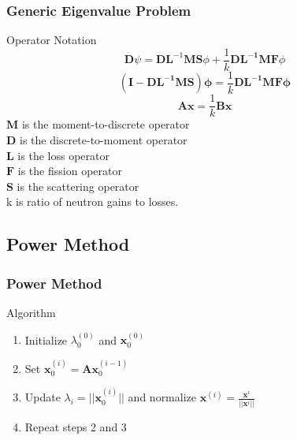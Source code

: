\documentclass[fleqn]{beamer}
\begin{document}
\begin{frame}
\frametitle{Generic Eigenvalue Problem\footnotemark}
\begin{block}{Operator Notation}
\vspace*{-\baselineskip}\setlength\belowdisplayshortskip{0pt}
\begin{equation*}
  \mathbf{D} \psi =  \mathbf{DL}^{-1}\mathbf{MS}\phi + \frac{1}{k} \mathbf{DL^{-1}MF} \phi  
 \label{eq:operatortrans}
\end{equation*}
\begin{equation*}
  \mathbf{(I - DL^{-1}MS)} \mathbf{\phi} = \frac{1}{k} \mathbf{DL^{-1}MF} \mathbf{\phi}  
 \label{eq:keig}
\end{equation*}
\begin{equation*}
 \mathbf{Ax} = \frac{1}{k} \mathbf{Bx}  
 \label{eq:Axb}
\end{equation*}
$\mathbf{M}$ is the moment-to-discrete operator\\
$\mathbf{D}$ is the discrete-to-moment operator\\
$\mathbf{L}$ is the loss operator\\
$\mathbf{F}$ is the fission operator\\
$\mathbf{S}$ is the scattering operator\\
k is ratio of neutron gains to losses.
\end{block}
\end{frame}    

\subsection{Power Method}
\begin{frame}
\frametitle{Power Method}
\begin{block}{Algorithm}
\begin{enumerate}
  \item Initialize $\lambda^{(0)}_0$ and $\mathbf{x}^{(0)}_0$ 
  \item Set $\mathbf{x}^{(i)}_0=\mathbf{A}\mathbf{x}^{(i-1)}_0$
  \item Update $\lambda_{i} = ||\mathbf{x}^{(i)}_0||$ and normalize $\mathbf{x}^{(i)} =\frac{\mathbf{x}^{i}}{||\mathbf{x}^{i}||}$
  \item Repeat steps 2 and 3 
\end{enumerate}
\end{block}
\end{frame}    
\end{document}

